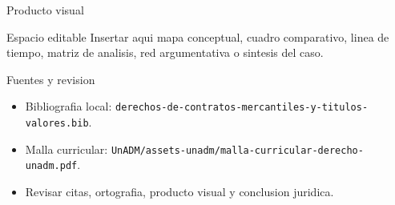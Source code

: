 \documentclass[
  spanish,
  aspectratio=169,
  xcolor={dvipsnames,table}
]{beamer}
\begin{document}
\begin{frame}{Producto visual}
  \begin{block}{Espacio editable}
    Insertar aqui mapa conceptual, cuadro comparativo, linea de tiempo,
    matriz de analisis, red argumentativa o sintesis del caso.
  \end{block}
  \centering
\end{frame}

\begin{frame}{Fuentes y revision}
  \begin{itemize}
    \item Bibliografia local: \texttt{derechos-de-contratos-mercantiles-y-titulos-valores.bib}.
    \item Malla curricular: \texttt{UnADM/assets-unadm/malla-curricular-derecho-unadm.pdf}.
    \item Revisar citas, ortografia, producto visual y conclusion juridica.
  \end{itemize}
\end{frame}
\end{document}

